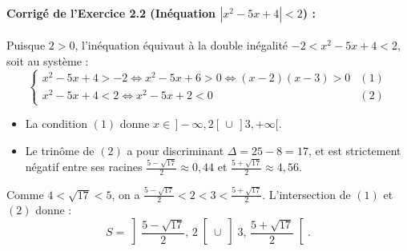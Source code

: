 \paragraph{Corrigé de l'Exercice 2.2 (Inéquation $|x^2 - 5x + 4| < 2$) :}
Puisque $2 > 0$, l'inéquation équivaut à la double inégalité $-2 < x^2 - 5x + 4 < 2$, soit au système :
\[
    \begin{cases}
        x^2 - 5x + 4 > -2 \iff x^2 - 5x + 6 > 0 \iff (x - 2)(x - 3) > 0 & (1) \\
        x^2 - 5x + 4 < 2 \iff x^2 - 5x + 2 < 0 & (2)
    \end{cases}
\]
\begin{itemize}
    \item La condition $(1)$ donne $x \in \,]-\infty, 2[ \,\cup\, ]3, +\infty[$.
    \item Le trinôme de $(2)$ a pour discriminant $\Delta = 25 - 8 = 17$, et est strictement négatif entre ses racines $\frac{5 - \sqrt{17}}{2} \approx 0,44$ et $\frac{5 + \sqrt{17}}{2} \approx 4,56$.
\end{itemize}
Comme $4 < \sqrt{17} < 5$, on a $\frac{5-\sqrt{17}}{2} < 2 < 3 < \frac{5+\sqrt{17}}{2}$. L'intersection de $(1)$ et $(2)$ donne :
\[
    \boxed{S = \left]\frac{5 - \sqrt{17}}{2},\, 2\right[ \cup \left]3,\, \frac{5 + \sqrt{17}}{2}\right[}.
\]

